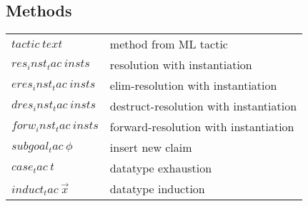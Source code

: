 \subsection{Methods}

\begin{tabular}{ll}
  $tactic~text$ & method from ML tactic \\
  $res_inst_tac~insts$ & resolution with instantiation \\
  $eres_inst_tac~insts$ & elim-resolution with instantiation \\
  $dres_inst_tac~insts$ & destruct-resolution with instantiation \\
  $forw_inst_tac~insts$ & forward-resolution with instantiation \\
  $subgoal_tac~\phi$ & insert new claim \\
  $case_tac~t$ & datatype exhaustion \\
  $induct_tac~\vec x$ & datatype induction \\
\end{tabular}


